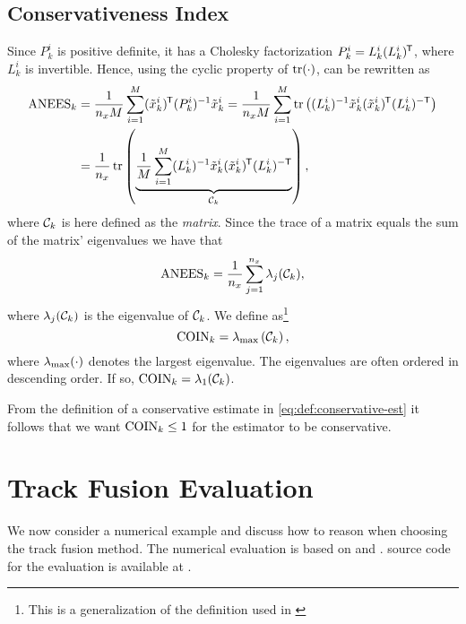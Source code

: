 \subsection{Conservativeness Index} \label{sec:coin}

Since $P_k^i$ is positive definite, it has a Cholesky factorization $P_k^i=L_k^i(L_k^i)^{\mkern-1.5mu\mathsf{T}}$, where $L_k^i$ is invertible. Hence, using the cyclic property of $\operatorname*{\rm tr}(\cdot)$, \abbrANEES can be rewritten as
\begin{align*}
	\text{ANEES}_k 
	&= \frac{1}{n_x M} \sum_{i=1}^M (\tilde{x}_k^i)^{\mkern-1.5mu\mathsf{T}}(P_k^i)^{-1} \tilde{x}_k^i 
	= \frac{1}{n_x M} \sum_{i=1}^M \operatorname*{\rm tr}\left( (L_k^i)^{-1}\tilde{x}_k^i(\tilde{x}_k^i)^{\mkern-1.5mu\mathsf{T}}(L_k^i)^{-\mathsf{T}} \right) \\
	&= \frac{1}{n_x} \operatorname*{\rm tr}\left( \underbrace{\frac{1}{M} \sum_{i=1}^M (L_k^i)^{-1}\tilde{x}_k^i(\tilde{x}_k^i)^{\mkern-1.5mu\mathsf{T}}(L_k^i)^{-\mathsf{T}} }_{\mathcal{C}_k} \right),
\end{align*}
where $\mathcal{C}_k$ is here defined as the \emph{\abbrNEES matrix}. Since the trace of a matrix equals the sum of the matrix' eigenvalues we have that
\begin{equation*}
	\text{ANEES}_k = \frac{1}{n_x} \sum_{j=1}^{n_x} \lambda_j(\mathcal{C}_k),
\end{equation*}
where $\lambda_j(\mathcal{C}_k)$ is the \jth eigenvalue of $\mathcal{C}_k$. We define \abbrCOIN as\footnote{This is a generalization of the definition used in \cite{Forsling2023Phd}}
\begin{equation}
    \coin_k = \lambdamax\left(\calC_k\right),
    \label{eq:def:coin}
\end{equation} 
where $\lambda_{\max}(\cdot)$ denotes the largest eigenvalue. The eigenvalues are often ordered in descending order. If so, $\text{COIN}_k=\lambda_{1}(\mathcal{C}_k)$.

From the definition of a conservative estimate in \eqref{eq:def:conservative-est} it follows that we want $\text{COIN}_k\leq1$ for the estimator to be conservative. 








\section{Track Fusion Evaluation}

We now consider a numerical \abbrDTT example and discuss how to reason when choosing the track fusion method. The numerical evaluation is based on \abbrRMT and \abbrCOIN. \matlab source code for the evaluation is available at \githuburl.


